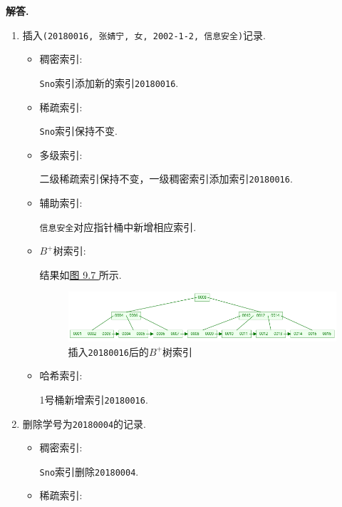 \documentclass[12pt, oneside]{ctexart}
\numberwithin{figure}{section}
\numberwithin{table}{section}
\newenvironment{solution}{\par\noindent\textbf{解答. }}{\par}
\begin{document}
\begin{solution}
    \begin{enumerate}[(1)]
        \item 插入\texttt{(20180016, 张婧宁, 女, 2002-1-2, 信息安全)}记录.
            \begin{itemize}
                \item 稠密索引:
                
                    \qquad \texttt{Sno}索引添加新的索引\texttt{20180016}. 
                \item 稀疏索引:
                
                    \qquad \texttt{Sno}索引保持不变.
                \item 多级索引:
                
                    \qquad 二级稀疏索引保持不变，一级稠密索引添加索引\texttt{20180016}.
                \item 辅助索引:
                
                    \qquad \texttt{信息安全}对应指针桶中新增相应索引.
                \item $B^+$树索引:
                
                    \qquad 结果如\hyperref[fig:9-1-1_B+树索引]{图 9.7 }所示.
                    \begin{figure}[!htbp]
                        \centering
                        \includegraphics[width=13cm]{images/sec9/B+Tree_Case_1.png}
                        \caption{插入\texttt{20180016}后的$B^+$树索引}
                        \label{fig:9-1-1_B+树索引}
                    \end{figure}
                \item 哈希索引:
                
                    \qquad 1号桶新增索引\texttt{20180016}.
                \end{itemize}
        \item 删除学号为\texttt{20180004}的记录.
            \begin{itemize}
                \item 稠密索引:
                
                    \qquad \texttt{Sno}索引删除\texttt{20180004}.
                \item 稀疏索引:
                    

\end{itemize}
\end{enumerate}
\end{solution}
\end{document}
